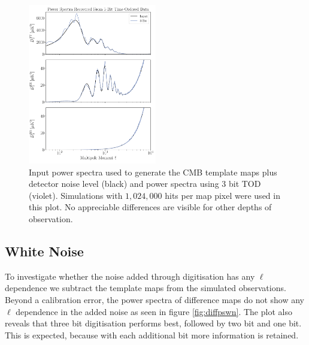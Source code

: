 \documentclass[apj]{emulateapj}
\begin{document}


\begin{figure}[htb]\centering
\includegraphics[width=0.5\textwidth,clip]{Plots/psrecovery.pdf}
  \caption[Current ]{
  Input power spectra used to generate the CMB template maps plus detector noise level (black) and power spectra using 3 bit TOD (violet). Simulations with $1,024,000$ hits per map pixel were used in this plot. No appreciable differences are visible for other depths of observation.
\label{fig:psrecover}
}
\end{figure}

\subsection{White Noise}
\label{subsec:whitenoise}

To investigate whether the noise added through digitisation has any $\ell$ dependence we subtract the template maps from the simulated observations. Beyond a calibration error, the power spectra of difference maps do not show any $\ell$ dependence in the added noise as seen in figure \ref{fig:diffpswn}. The plot also reveals that three bit digitisation performs best, followed by two bit and one bit. This is expected, because with each additional bit more information is retained.
\end{document}
